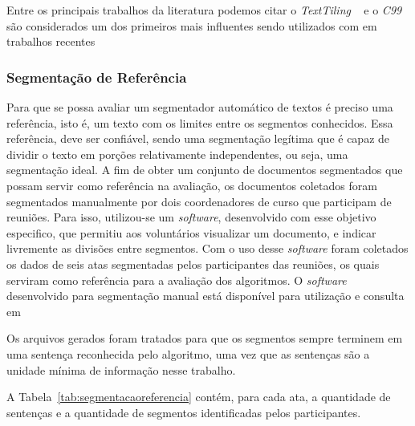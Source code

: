 
Entre os principais trabalhos da literatura podemos citar o \textit{TextTiling} ~\cite{Hearst1994} e o \textit{C99}~\cite{Choi2000} são considerados um dos primeiros mais influentes sendo utilizados com  em trabalhos recentes\cite{CHAIBI2014, Naili2016, Cardoso2017}



\subsubsection{Segmentação de Referência}
	 \label{subsubsec:segmetacaoreferencia}

 Para que se possa avaliar um segmentador automático de textos é preciso uma referência, isto é, um texto com os limites entre os segmentos conhecidos. Essa referência, deve ser confiável, sendo uma segmentação legítima que é capaz de dividir o texto em porções relativamente independentes, ou seja, uma segmentação ideal.
A fim de obter um conjunto de documentos segmentados que possam servir como referência na avaliação, os documentos coletados foram segmentados manualmente por dois coordenadores de curso que participam de reuniões. Para isso, utilizou-se um \textit{software}, desenvolvido com esse objetivo especifico, que permitiu aos voluntários visualizar um documento, e indicar livremente as divisões entre segmentos. Com o uso desse \textit{software} foram coletados os dados de seis atas segmentadas pelos participantes das reuniões, os quais serviram como referência para a avaliação dos algoritmos. O \textit{software} desenvolvido para segmentação manual está disponível para utilização e consulta em~\urlsoftwares	

Os arquivos gerados foram tratados para que os segmentos sempre terminem em uma sentença reconhecida pelo algoritmo, uma vez que as sentenças são a unidade mínima de informação nesse trabalho.

A Tabela~\ref{tab:segmentacaoreferencia} contém, para cada ata, a quantidade de sentenças e a quantidade de segmentos identificadas pelos participantes.




